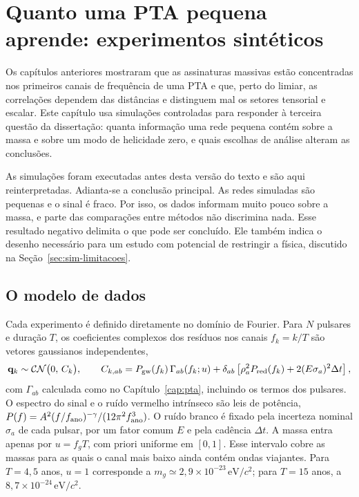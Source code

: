 \chapter{Quanto uma PTA pequena aprende: experimentos sintéticos}
\label{cap:simulacoes}

Os capítulos anteriores mostraram que as assinaturas massivas estão
concentradas nos primeiros canais de frequência de uma PTA e que, perto
do limiar, as correlações dependem das distâncias e distinguem mal os
setores tensorial e escalar. Este capítulo usa simulações controladas
para responder à terceira questão da dissertação: quanta informação uma
rede pequena contém sobre a massa e sobre um modo de helicidade zero, e
quais escolhas de análise alteram as conclusões.

As simulações foram executadas antes desta versão do texto e são aqui
reinterpretadas. Adianta-se a conclusão principal. As redes simuladas
são pequenas e o sinal é fraco. Por isso, os dados informam muito pouco
sobre a massa, e parte das comparações entre métodos não discrimina
nada. Esse resultado negativo delimita o que pode ser concluído. Ele
também indica o desenho necessário para um estudo com potencial de
restringir a física, discutido na Seção~\ref{sec:sim-limitacoes}.

\section{O modelo de dados}

Cada experimento é definido diretamente no domínio de Fourier. Para
$N$ pulsares e duração $T$, os coeficientes complexos dos resíduos nos
canais $f_k=k/T$ são vetores gaussianos independentes,
\begin{equation}
 \mathbf q_k\sim\mathcal{CN}\big(0,\,C_k\big),\qquad
 C_{k,ab}=P_{\rm gw}(f_k)\,\Gamma_{ab}(f_k;u)
 +\delta_{ab}\left[\rho_a^2P_{\rm red}(f_k)+2(E\sigma_a)^2\Delta t\right],
 \label{eq:sim-modelo}
\end{equation}
com $\Gamma_{ab}$ calculada como no Capítulo~\ref{cap:pta}, incluindo
os termos dos pulsares. O espectro do sinal e o ruído vermelho
intrínseco são leis de potência,
$P(f)=A^2(f/f_{\rm ano})^{-\gamma}/(12\pi^2f_{\rm ano}^3)$. O ruído
branco é fixado pela incerteza nominal $\sigma_a$ de cada pulsar, por
um fator comum $E$ e pela cadência $\Delta t$. A massa entra apenas por
$u=f_gT$, com priori uniforme em $[0,1]$. Esse intervalo cobre as massas
para as quais o canal mais baixo ainda contém ondas viajantes. Para
$T=4{,}5$ anos, $u=1$ corresponde a
$m_g\simeq2{,}9\times10^{-23}\,\mathrm{eV}/c^2$; para $T=15$ anos, a
$8{,}7\times10^{-24}\,\mathrm{eV}/c^2$.

